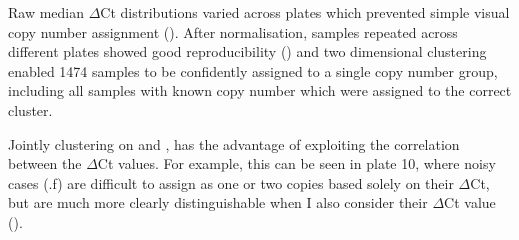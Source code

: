 Raw median $\Delta$Ct distributions varied across plates which prevented simple visual copy number assignment ().
After normalisation, samples repeated across different plates showed good reproducibility () and two dimensional clustering enabled 1474 samples to be confidently assigned to a single copy number group, including all samples with known copy number which were assigned to the correct cluster.

Jointly clustering on  and , has the advantage of exploiting the correlation between the $\Delta$Ct values. 
For example, this can be seen in plate 10, where noisy cases (.f) are difficult to assign as one or two copies based solely on their  $\Delta$Ct, but are much more clearly distinguishable when I also consider their  $\Delta$Ct value ().



